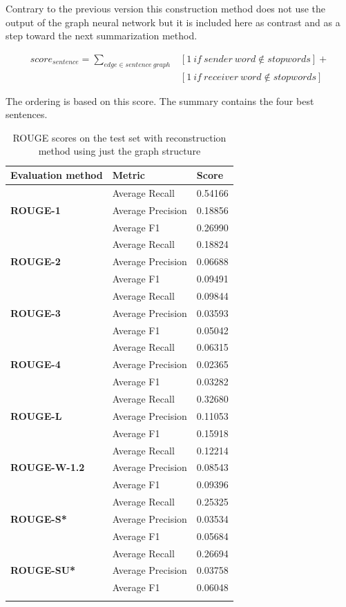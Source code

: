 Contrary to the previous version this construction method does not use the output of the graph neural network but it is included here as contrast and as a step toward the next summarization method.

\begin{eqnarray*}
	score_{sentence} = \sum_{edge \in sentence\ graph} &[1\ if\ sender\ word \notin stopwords] + \\&[1\ if\ receiver\ word \notin stopwords]
\end{eqnarray*}

The ordering is based on this score. The summary contains the four best sentences.

\begin{longtable}{| l | l | l |}
	\hline
	\textbf{Evaluation method}&\textbf{Metric}&\textbf{Score}\\ \hline \hline		
	\multirow{3}{*}{\textbf{ROUGE-1}}
		&Average Recall&0.54166 \\
		&Average Precision&0.18856 \\
		&Average F1&0.26990 \\ \hline \hline
	\multirow{3}{*}{\textbf{ROUGE-2}}
		&Average Recall&0.18824 \\
		&Average Precision&0.06688 \\
		&Average F1&0.09491 \\ \hline \hline
	\multirow{3}{*}{\textbf{ROUGE-3}}
		&Average Recall&0.09844 \\
		&Average Precision&0.03593 \\
		&Average F1&0.05042 \\ \hline \hline
	\multirow{3}{*}{\textbf{ROUGE-4}}
		&Average Recall&0.06315 \\
		&Average Precision&0.02365 \\
		&Average F1&0.03282 \\ \hline \hline
	\multirow{3}{*}{\textbf{ROUGE-L}}
		&Average Recall&0.32680 \\
		&Average Precision&0.11053 \\
		&Average F1&0.15918 \\ \hline \hline
	\multirow{3}{*}{\textbf{ROUGE-W-1.2}}
		&Average Recall&0.12214 \\
		&Average Precision&0.08543 \\
		&Average F1&0.09396 \\ \hline \hline
	\multirow{3}{*}{\textbf{ROUGE-S*}}
		&Average Recall&0.25325 \\
		&Average Precision&0.03534 \\
		&Average F1&0.05684 \\ \hline \hline
	\multirow{3}{*}{\textbf{ROUGE-SU*}}
		&Average Recall&0.26694 \\
		&Average Precision&0.03758 \\
		&Average F1&0.06048 \\ \hline
	\caption{ROUGE scores on the test set with reconstruction method using just the graph structure}
\end{longtable}

